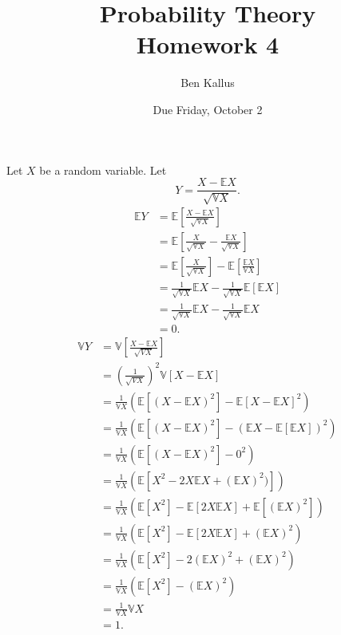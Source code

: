 \documentclass[12pt]{article}
\title{Probability Theory \\ Homework 4}
\author{Ben Kallus}
\date{Due Friday, October 2}
\begin{document}
\maketitle


    Let $X$ be a random variable. Let $$Y=\frac{X-\mathbb EX}{\sqrt{\mathbb VX}}.$$
    \begin{align*}
        \mathbb EY &= \mathbb E[\frac{X-\mathbb EX}{\sqrt{\mathbb VX}}] \\
                   &= \mathbb E[\frac{X}{\sqrt{\mathbb VX}} - \frac{\mathbb EX}{\sqrt{\mathbb VX}}] \\
                   &= \mathbb E[\frac{X}{\sqrt{\mathbb VX}}] - \mathbb E[\frac{\mathbb EX}{\mathbb VX}] \\
                   &= \frac{1}{\sqrt{\mathbb VX}} \mathbb EX - \frac{1}{\sqrt{\mathbb VX}} \mathbb E[\mathbb EX] \\
                   &= \frac{1}{\sqrt{\mathbb VX}} \mathbb EX - \frac{1}{\sqrt{\mathbb VX}} \mathbb EX \\
                   &= 0.
    \end{align*}
    \begin{align*}
        \mathbb VY &=\mathbb V[\frac{X-\mathbb EX}{\sqrt{VX}}] \\
                   &= (\frac{1}{\sqrt{VX}})^2 \mathbb V[X - \mathbb EX] \\
                   &= \frac{1}{\mathbb VX}(\mathbb E[(X - \mathbb EX)^2] - \mathbb E[X- \mathbb EX]^2) \\
                   &= \frac{1}{\mathbb VX}(\mathbb E[(X - \mathbb EX)^2] - (\mathbb EX - \mathbb E [\mathbb EX])^2) \\
                   &= \frac{1}{\mathbb VX}(\mathbb E[(X - \mathbb EX)^2] - 0^2) \\
                   &= \frac{1}{\mathbb VX}(\mathbb E[X^2 - 2X\mathbb EX + (\mathbb EX)^2)]) \\
                   &= \frac{1}{\mathbb VX}(\mathbb E[X^2] - \mathbb E[2X\mathbb EX] + \mathbb E[(\mathbb EX)^2]) \\
                   &= \frac{1}{\mathbb VX}(\mathbb E[X^2] - \mathbb E[2X\mathbb EX] + (\mathbb EX)^2) \\
                   &= \frac{1}{\mathbb VX}(\mathbb E[X^2] - 2(\mathbb EX)^2 + (\mathbb EX)^2) \\
                   &= \frac{1}{\mathbb VX}(\mathbb E[X^2] - (\mathbb EX)^2) \\
                   &= \frac{1}{\mathbb VX}\mathbb VX \\
                   &= 1.
    \end{align*}
    
\end{document}
